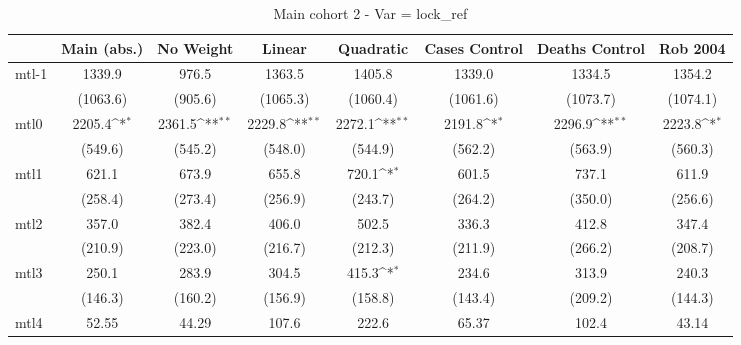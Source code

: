 \documentclass{article}
\begin{document}
{
\def\sym#1{\ifmmode^{#1}\else\(^{#1}\)\fi}
\begin{longtable}{l*{7}{c}}
\caption{Main cohort 2 - Var = lock\_ref}\\
\hline\hline\endfirsthead\hline\endhead\hline\endfoot\endlastfoot
                &\multicolumn{1}{c}{Main (abs.)}&\multicolumn{1}{c}{No Weight}&\multicolumn{1}{c}{Linear}&\multicolumn{1}{c}{Quadratic}&\multicolumn{1}{c}{Cases Control}&\multicolumn{1}{c}{Deaths Control}&\multicolumn{1}{c}{Rob 2004}\\
\hline
mtl-1           &   1339.9         &    976.5         &   1363.5         &   1405.8         &   1339.0         &   1334.5         &   1354.2         \\
                & (1063.6)         &  (905.6)         & (1065.3)         & (1060.4)         & (1061.6)         & (1073.7)         & (1074.1)         \\
mtl0            &   2205.4\sym{*}  &   2361.5\sym{**} &   2229.8\sym{**} &   2272.1\sym{**} &   2191.8\sym{*}  &   2296.9\sym{**} &   2223.8\sym{*}  \\
                &  (549.6)         &  (545.2)         &  (548.0)         &  (544.9)         &  (562.2)         &  (563.9)         &  (560.3)         \\
mtl1            &    621.1         &    673.9         &    655.8         &    720.1\sym{*}  &    601.5         &    737.1         &    611.9         \\
                &  (258.4)         &  (273.4)         &  (256.9)         &  (243.7)         &  (264.2)         &  (350.0)         &  (256.6)         \\
mtl2            &    357.0         &    382.4         &    406.0         &    502.5         &    336.3         &    412.8         &    347.4         \\
                &  (210.9)         &  (223.0)         &  (216.7)         &  (212.3)         &  (211.9)         &  (266.2)         &  (208.7)         \\
mtl3            &    250.1         &    283.9         &    304.5         &    415.3\sym{*}  &    234.6         &    313.9         &    240.3         \\
                &  (146.3)         &  (160.2)         &  (156.9)         &  (158.8)         &  (143.4)         &  (209.2)         &  (144.3)         \\
mtl4            &    52.55         &    44.29         &    107.6         &    222.6         &    65.37         &    102.4         &    43.14         \\

\end{longtable}}
\end{document}
